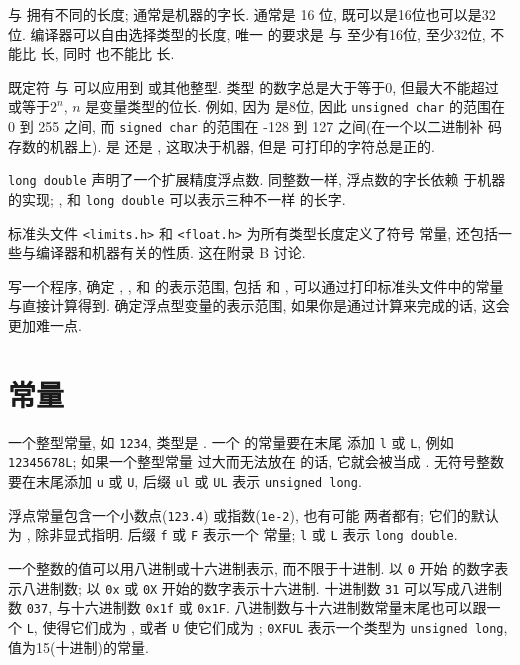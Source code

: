 \cshort 与 \clong 拥有不同的长度; \cint 通常是机器的字长. \cshort 通常是 
16 位, \cint 既可以是16位也可以是32位. 编译器可以自由选择类型的长度, 唯一
的要求是 \cshort 与 \cint 至少有16位, \clong 至少32位, \cshort 不能比 \cint 
长, 同时 \cint 也不能比 \clong 长.

既定符 \csigned 与 \cunsigned 可以应用到 \cchar 或其他整型. \cunsigned 类型
的数字总是大于等于0, 但最大不能超过或等于$2^n$, $n$ 是变量类型的位长. 
例如, 因为 \cchar 是8位, 因此 \texttt{unsigned char} 的范围在 0 到 255
之间, 而 \texttt{signed char} 的范围在 -128 到 127 之间(在一个以二进制补
码存数的机器上). \cchar 是 \csigned 还是 \cunsigned, 这取决于机器, 但是 
可打印的字符总是正的.

\texttt{long double} 声明了一个扩展精度浮点数. 同整数一样, 浮点数的字长依赖
于机器的实现; \cfloat, \cdouble 和 \texttt{long double} 可以表示三种不一样
的长字.

标准头文件 \texttt{<limits.h>} 和 \texttt{<float.h>} 为所有类型长度定义了符号
常量, 还包括一些与编译器和机器有关的性质. 这在附录 B 讨论.

\exercise 写一个程序, 确定 \cchar, \cshort, \cint 和 \clong 的表示范围,
包括 \csigned 和 \cunsigned, 可以通过打印标准头文件中的常量与直接计算得到.
确定浮点型变量的表示范围, 如果你是通过计算来完成的话, 这会更加难一点.

\section{常量}
一个整型常量, 如 \texttt{1234}, 类型是 \cint. 一个 \clong 的常量要在末尾
添加 \texttt{l} 或 \texttt{L}, 例如 \texttt{12345678L}; 如果一个整型常量
过大而无法放在 \cint 的话, 它就会被当成 \clong. 无符号整数要在末尾添加
\texttt{u} 或 \texttt{U}, 后缀 \texttt{ul} 或 \texttt{UL} 表示 
\texttt{unsigned long}.

浮点常量包含一个小数点(\texttt{123.4}) 或指数(\texttt{1e-2}), 也有可能
两者都有; 它们的默认为 \cdouble, 除非显式指明. 后缀 \texttt{f} 或 
\texttt{F} 表示一个 \cfloat 常量; \texttt{l} 或 \texttt{L} 表示 
\texttt{long double}.

一个整数的值可以用八进制或十六进制表示, 而不限于十进制. 以 \texttt{0} 开始
的数字表示八进制数; 以 \texttt{0x} 或 \texttt{0X} 开始的数字表示十六进制.
十进制数 \texttt{31} 可以写成八进制数 \texttt{037}, 与十六进制数
\texttt{0x1f} 或 \texttt{0x1F}. 八进制数与十六进制数常量末尾也可以跟一个
\texttt{L}, 使得它们成为 \clong, 或者 \texttt{U} 使它们成为 \cunsigned;
\texttt{0XFUL} 表示一个类型为 \texttt{unsigned long}, 值为15(十进制)的常量.

